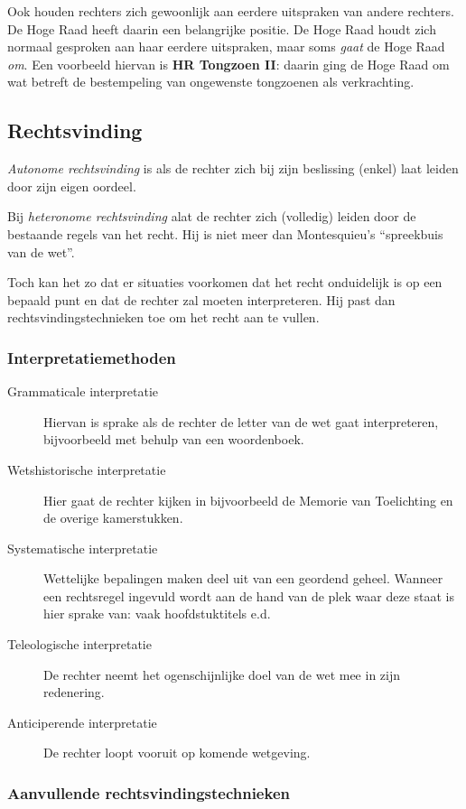 \documentclass{article}
\begin{document}
Ook houden rechters zich gewoonlijk aan eerdere uitspraken van andere rechters.
De Hoge Raad heeft daarin een belangrijke positie. De Hoge Raad houdt zich
normaal gesproken aan haar eerdere uitspraken, maar soms \emph{gaat} de Hoge
Raad \emph{om}. Een voorbeeld hiervan is \textbf{HR Tongzoen II}: daarin ging
de Hoge Raad om wat betreft de bestempeling van ongewenste tongzoenen als
verkrachting.

\subsection{Rechtsvinding}

\emph{Autonome rechtsvinding} is als de rechter zich bij zijn beslissing
(enkel) laat leiden door zijn eigen oordeel.

Bij \emph{heteronome rechtsvinding} alat de rechter zich (volledig) leiden
door de bestaande regels van het recht. Hij is niet meer dan Montesquieu's
``spreekbuis van de wet''.

Toch kan het zo dat er situaties voorkomen dat het recht onduidelijk is
op een bepaald punt en dat de rechter zal moeten interpreteren. Hij past
dan rechtsvindingstechnieken toe om het recht aan te vullen.

\subsubsection{Interpretatiemethoden}
\begin{description}
  \item[Grammaticale interpretatie] Hiervan is sprake als de rechter de letter
    van de wet gaat interpreteren, bijvoorbeeld met behulp van een woordenboek.
  \item[Wetshistorische interpretatie] Hier gaat de rechter kijken in bijvoorbeeld
    de Memorie van Toelichting en de overige kamerstukken.
  \item[Systematische interpretatie] Wettelijke bepalingen maken deel uit van een
    geordend geheel. Wanneer een rechtsregel ingevuld wordt aan de hand van
    de plek waar deze staat is hier sprake van: vaak hoofdstuktitels e.d.
  \item[Teleologische interpretatie] De rechter neemt het ogenschijnlijke doel
    van de wet mee in zijn redenering.
  \item[Anticiperende interpretatie] De rechter loopt vooruit op komende
    wetgeving.
\end{description}

\subsubsection{Aanvullende rechtsvindingstechnieken}
\end{document}
